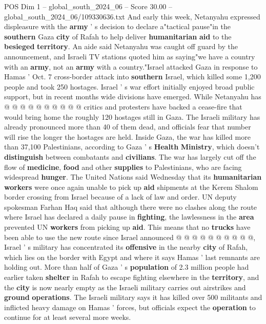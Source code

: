 \begin{textsample}{POS Dim 1 – global\_south\_2024\_06 – Score 30.00 – global\_south\_2024\_06/109330636.txt}
And early this week, Netanyahu expressed displeasure with the \textbf{army} ' s decision to declare a"tactical pause"in the \textbf{southern} Gaza \textbf{city} of Rafah to help deliver \textbf{humanitarian} \textbf{aid} to the \textbf{besieged} \textbf{territory}.
An aide said Netanyahu was caught off guard by the announcement, and Israeli TV stations quoted him as saying"we have a country with an \textbf{army}, not an \textbf{army} with a country."Israel attacked Gaza in response to Hamas ' Oct. 7 cross-border attack into \textbf{southern} Israel, which killed some 1,200 people and took 250 hostages.
Israel ' s war effort initially enjoyed broad public support, but in recent months wide divisions have emerged.
While Netanyahu has @ @ @ @ @ @ @ @ @ @ critics and protesters have backed a cease-fire that would bring home the roughly 120 hostages still in Gaza.
The Israeli military has already pronounced more than 40 of them dead, and officials fear that number will rise the longer the hostages are held.
Inside Gaza, the war has killed more than 37,100 Palestinians, according to Gaza ' s \textbf{Health} \textbf{Ministry}, which doesn't \textbf{distinguish} between combatants and \textbf{civilians}.
The war has largely cut off the flow of \textbf{medicine}, \textbf{food} and other \textbf{supplies} to Palestinians, who are facing widespread \textbf{hunger}.
The United Nations said Wednesday that its \textbf{humanitarian} \textbf{workers} were once again unable to pick up \textbf{aid} shipments at the Kerem Shalom border crossing from Israel because of a lack of law and order.
UN deputy spokesman Farhan Haq said that although there were no clashes along the route where Israel has declared a daily pause in \textbf{fighting}, the lawlessness in the \textbf{area} prevented UN \textbf{workers} from picking up \textbf{aid}.
This means that no \textbf{trucks} have been able to use the new route since Israel announced @ @ @ @ @ @ @ @ @ @, Israel ' s military has concentrated its \textbf{offensive} in the nearby \textbf{city} of Rafah, which lies on the border with Egypt and where it says Hamas ' last remnants are holding out.
More than half of Gaza ' s \textbf{population} of 2.3 million people had earlier taken \textbf{shelter} in Rafah to escape fighting elsewhere in the \textbf{territory}, and the \textbf{city} is now nearly empty as the Israeli military carries out airstrikes and \textbf{ground} \textbf{operations}.
The Israeli military says it has killed over 500 militants and inflicted heavy damage on Hamas ' forces, but officials expect the \textbf{operation} to continue for at least several more weeks.

\end{textsample}
